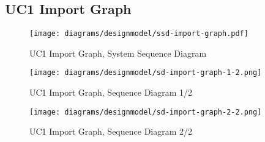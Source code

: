 \subsection{UC1 Import Graph}
\begin{figure}[H]
    \centering
    \texttt{[image: diagrams/designmodel/ssd-import-graph.pdf]}
    \caption{UC1 Import Graph, System Sequence Diagram}
    \label{fig:import-graph-ssd}
\end{figure}
\begin{figure}[p]%
  \begin{leftfullpage}
    \texttt{[image: diagrams/designmodel/sd-import-graph-1-2.png]}
    \caption{UC1 Import Graph, Sequence Diagram 1/2}
    \label{fig:import-graph-sd-1}
  \end{leftfullpage}
\end{figure}
\begin{figure}[p]%
  \begin{fullpage}
    \texttt{[image: diagrams/designmodel/sd-import-graph-2-2.png]}
    \caption{UC1 Import Graph, Sequence Diagram 2/2}
    \label{fig:import-graph-sd-2}
  \end{fullpage}
\end{figure}
% 
